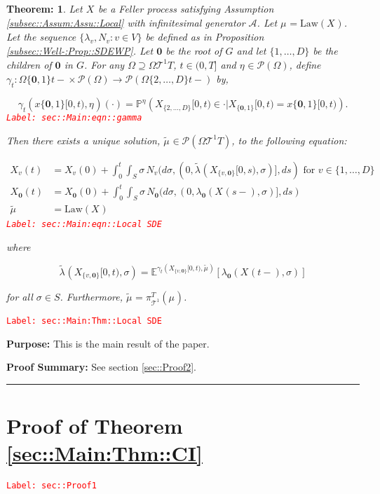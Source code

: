 \documentclass[12pt]{article}
\newcommand{\mb}{\mathbb}
\newcommand{\mc}{\mathcal}
\newcommand{\ra}{\rightarrow}
\newcommand{\te}{\text}
\newcommand{\tr}{\textcolor{red}}
\newcommand{\labe}[1]{\tr{\texttt{Label: #1}}}
\newcommand{\purpose}{\textbf{Purpose: }}
\newcommand{\pfsum}{\textbf{Proof Summary: }}
\newcommand{\lin}{\rule{\linewidth}{0.4 pt}}
\newcommand{\pr}{\mb{P}}							%
\newcommand{\exmu}[2]{\mb{E}^{#1}\left[#2\right]}	%
\newcommand{\pmsr}{\mc{P}}							%
\renewcommand{\root}{\mathbf{0}}				%
\renewcommand{\v}{v}							%
\renewcommand{\S}{S}							%
\newcommand{\s}{\sigma}							%
\newcommand{\T}{T}								%
\newcommand{\x}{x}								%
\renewcommand{\t}{t}							%
\renewcommand{\tt}{s}							%
\newcommand{\degr}{D}								%
\newcommand{\poiss}[1]{N_{#1}}						%
\newcommand{\IG}{\mc{A}}						%
\newcommand{\law}{\te{Law}}							%
\newcommand{\pup}[1]{^{#1}}							%
\newcommand{\tree}{\mc{T}}							%
\renewcommand{\G}{G}								%
\newcommand{\V}{V}									%
\newcommand{\piV}[2]{\pi_{#1}^{#2}}					%
\newcommand{\rxvt}[2]{X_{#1}{(#2)}}					%
\newcommand{\rxvts}[2]{X_{#1}{#2}}					%
\newcommand{\m}[3]{\mu_{#2#1}^{#3}}						%
\newcommand{\mmm}[3]{\eta_{#2#1}^{#3}}						%
\newcommand{\cm}{\gamma}							%
\newcommand{\rate}[1]{\lambda_{#1}}					%
\newcommand{\alt}{\widetilde}						%
\newtheorem{thms}{Theorem: }[section]
\begin{document}
\begin{thms}
Let \(\rxvts{}{}\) be a Feller process satisfying Assumption \ref{subsec::Assum:Assu::Local} with infinitesimal generator \(\IG\). Let \(\m{}{}{} = \law(\rxvts{}{})\). Let the sequence \(\{\rate{\v},\poiss{\v}:\v\in \V\}\) be defined as in Proposition \ref{subsec::Well-:Prop::SDEWP}. Let \(\root\) be the root of \(\G\) and let \(\{1,\dots,\degr\}\) be the children of \(\root\) in \(\G\). For any \(\Omega \supseteq\Omega{\tree\pup{1}}{\T}\), \(\t\in (0,\T]\) and \(\mmm{}{}{} \in \pmsr(\Omega)\), define \(\cm_\t:\Omega{\{\root,1\}}{\t-}\times \pmsr(\Omega) \ra \pmsr(\Omega{\{2,\dots,\degr\}}{\t-})\) by,

\begin{equation}
\cm_\t(\x{\{\root,1\}}{[0,\t)},\mmm{}{}{})(\cdot) = \pr^{\mmm{}{}{}}\left(\rxvts{\{2,\dots,\degr\}}{[0,\t)} \in \cdot|\rxvts{\{\root,1\}}{[0,\t)} = \x{\{\root,1\}}{[0,\t)}\right).
\label{sec::Main:eqn::gamma}
\end{equation}
\labe{sec::Main:eqn::gamma}

Then there exists a unique solution, \(\alt{\m{}{}{}} \in \pmsr(\Omega{\tree\pup{1}}{\T})\), to the following equation:

\begin{align}
\rxvt{\v}{\t} &= \rxvt{\v}{0} + \int_0^\t\int_\S \s\,\poiss{\v}(d\s,(0,\alt{\rate{}}(\rxvts{\{\v,\root\}}{[0,\tt)},\s)],d\tt) \te{ for } \v \in \{1,\dots,\degr\}\nonumber\\
\rxvt{\root}{\t} &= \rxvt{\root}{0} + \int_0^\t\int_\S \s\,\poiss{\root}(d\s,(0,\rate{\root}(\rxvt{}{\tt-},\s)],d\tt)\nonumber\\
\alt{\m{}{}{}} &= \law(\rxvts{}{})
\label{sec::Main:eqn::Local SDE}
\end{align}
\labe{sec::Main:eqn::Local SDE}

where

\[\alt{\rate{}}(\rxvts{\{\v,\root\}}{[0,\t)},\s) = \exmu{\cm_t(\rxvts{\{\v,\root\}}{[0,\t)},\alt{\m{}{}{}})}{\rate{\root}(\rxvt{}{\t-},\s)}\]

for all \(\s\in \S\). Furthermore, \(\alt{\m{}{}{}} = \piV{\tree\pup{1}}{\T}(\m{}{}{})\).
\label{sec::Main:Thm::Local SDE}
\end{thms}
\labe{sec::Main:Thm::Local SDE}

\purpose This is the main result of the paper. 

\pfsum See section \ref{sec::Proof2}.

\lin

\section{Proof of Theorem \ref{sec::Main:Thm::CI}}
\label{sec::Proof1}\labe{sec::Proof1}
\end{document}

